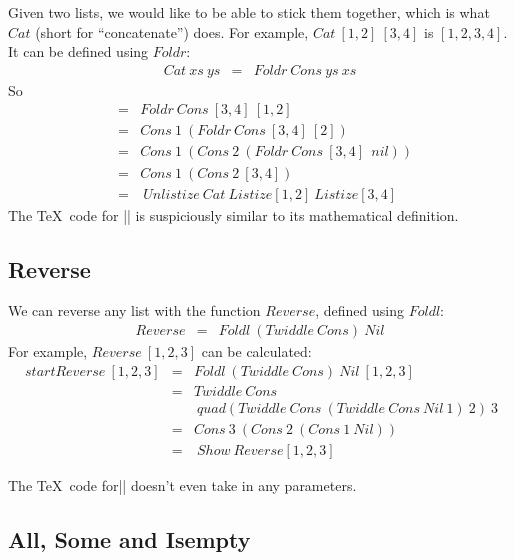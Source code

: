 Given two lists, we would like to be able to stick them together,
which is what $Cat$ (short for ``concatenate'')
does.  For example, $Cat~[1,2]~[3,4]$ is
$[1,2,3,4]$.  It can be defined using $Foldr$:
\begin{eqnarray*}
   Cat~xs~ys  &  =  &  Foldr~Cons~ys~xs
\end{eqnarray*}
So
\begin{eqnarray*}
   &  =  &  Foldr~Cons~[3,4]~[1,2]  \\
   &  =  &  Cons~1~(Foldr~Cons~[3,4]~[2])  \\
   &  =  &  Cons~1~(Cons~2~(Foldr~Cons~[3,4]~\ nil))  \\
   &  =  &  Cons~1~(Cons~2~[3,4])  \\
   &  =  &  \ Unlistize{\ Cat{\ Listize[1,2]}{\ Listize[3,4]}}
\end{eqnarray*}
The \TeX\ code for |\Cat| is suspiciously similar to its mathematical
definition.
\begin{teX}
\def\Cat#1#2{\Foldr\Cons{#2}{#1}}
\end{teX}




\subsection{Reverse}

We can reverse any list with the function $Reverse$, defined using
$Foldl$:
\begin{eqnarray*}
   Reverse  &  =  &  Foldl~(Twiddle~Cons)~Nil
\end{eqnarray*}
For example, $Reverse~[1,2,3]$ can be calculated:
\begin{eqnarray*}
   \ start{Reverse~[1,2,3]}  
   &  =  &  Foldl~(Twiddle~Cons)~Nil~[1,2,3]  \\
   &  =  &  Twiddle~Cons  \\
   &     &  \ quad (Twiddle~Cons~(Twiddle~Cons~Nil~1)~2)~3  \\
   &  =  &  Cons~3~(Cons~2~(Cons~1~Nil))  \\
   &  =  &  \ Show\ Reverse[1,2,3]
\end{eqnarray*}

The \TeX\ code for|\Reverse| doesn't even take in any parameters.

\begin{teX}
\def\Reverse{\Foldl{\Twiddle\Cons}\Nil}
\end{teX}



\subsection{All, Some and Isempty}

